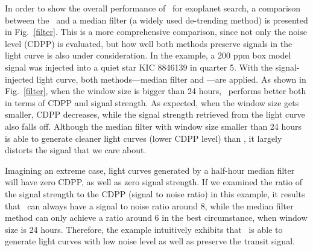 In order to show the overall performance of \name\ for exoplanet search, a comparison between the \name\ and a median filter (a widely used de-trending method) is presented in Fig.~\ref{filter}. This is a more comprehensive comparison, since not only the noise level (CDPP) is evaluated,  but how well both methods preserve signals in the light curve is also under consideration. In the example, a 200 ppm box model signal was injected into a quiet star KIC 8846139 in quarter 5. With the signal-injected light curve,  both methods---median filter and \name---are applied. As shown in Fig.~\ref{filter}, when  the window size is bigger than 24 hours, \name\ performs better both in terms of CDPP and signal strength. As expected, when the window size gets smaller, CDPP decreases,  while the signal strength retrieved from the light curve also falls off. Although the median filter with window size smaller than 24 hours is able to generate cleaner light curves (lower CDPP level) than \name, it largely distorts the signal that we care about.

Imagining an extreme case, light curves generated by a half-hour median filter will have zero CDPP, as well as zero signal strength. If we examined the ratio of the signal strength to the CDPP (signal to noise ratio) in this example, it results that \name\ can always have a signal to noise ratio around 8, while the median filter method can only achieve a ratio around 6 in the best circumstance, when window size is 24 hours. Therefore, the example intuitively exhibits that \name\ is able to generate light curves with low noise level as well as preserve the transit signal.


